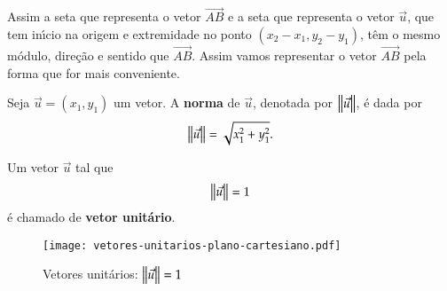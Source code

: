 Assim a seta que representa o vetor $\vec{AB}$ e a seta que representa o vetor $\vec{u}$, que tem in{\'\i}cio na origem e extremidade no ponto $(x_2 - x_1, y_2 - y_1)$, t\^em o mesmo m\'odulo, dire\c{c}\~ao e sentido que $\vec{AB}$. Assim vamos representar o vetor $\vec{AB}$ pela forma que for mais conveniente.

\begin{definicao}
  Seja $\vec{u} = (x_1, y_1)$ um vetor. A \textbf{norma} de $\vec{u}$, denotada por $\left\Vert{\vec{u}}\right\Vert$, \'e dada por
  \[
    \left\Vert{\vec{u}}\right\Vert = \sqrt{x_1^2 + y_1^2}.
  \]
\end{definicao}

Um vetor $\vec{u}$ tal que
\[
	\left\Vert{\vec{u}}\right\Vert = 1
\]
\'e chamado de \textbf{vetor unit\'ario}.
\begin{figure}[!h]
	\centering
	\caption{Vetores unit\'arios: $\left\Vert{\vec{u}}\right\Vert = 1$}
	\texttt{[image: vetores-unitarios-plano-cartesiano.pdf]}
\end{figure}


